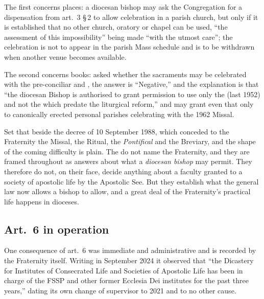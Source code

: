 The first concerns places: a diocesan bishop may ask the Congregation for
a dispensation from art.~3 §\,2 to allow celebration in a parish church,
but only if it is established that no other church, oratory or chapel can
be used, ``the assessment of this impossibility'' being made ``with the
utmost care''; the celebration is not to appear in the parish Mass
schedule and is to be withdrawn when another venue becomes
available.

The second concerns books: asked whether the sacraments may be celebrated
with the pre-conciliar  and , the answer is ``Negative,'' and the explanation is that ``the
diocesan Bishop is authorised to grant permission to use only the
 (last  1952) and not the
 which predate the liturgical reform,'' and may
grant even that only to canonically erected personal parishes celebrating
with the 1962 Missal.

Set that beside the decree of 10 September 1988, which conceded to the
Fraternity the Missal, the Ritual, the \emph{Pontifical} and the
Breviary, and the shape of the coming difficulty is plain. The
 do not name the Fraternity, and they are framed
throughout as answers about what a \emph{diocesan bishop} may permit. They
therefore do not, on their face, decide anything about a faculty granted
to a society of apostolic life by the Apostolic See. But they establish
what the general law now allows a bishop to allow, and a great deal of the
Fraternity's practical life happens in dioceses.

\subsection{Art.~6 in operation}

One consequence of art.~6 was immediate and administrative and is
recorded by the Fraternity itself. Writing in September 2024 it observed
that ``the Dicastery for Institutes of Consecrated Life and Societies of
Apostolic Life has been in charge of the FSSP and other former Ecclesia
Dei institutes for the past three years,'' dating its own change of
supervisor to 2021 and to no other cause.


